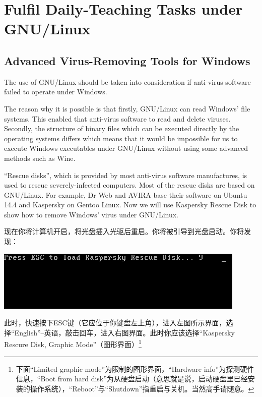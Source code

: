 \part{Fulfil Daily-Teaching Tasks under GNU/Linux}
\chapter{Advanced Virus-Removing Tools for Windows}
The use of GNU/Linux should be taken into consideration if anti-virus software failed to operate under Windows.\par
The reason why it is possible is that firstly, GNU/Linux can read Windows' file systems. This enabled that anti-virus software to read and delete viruses. Secondly, the structure of binary files which can be executed directly by the operating systems differs which means that it would be impossible for us to execute Windows executables under GNU/Linux without using some advanced methods such as Wine.\par
``Rescue disks'', which is provided by most anti-virus software manufactures, is used to rescue severely-infected computers. Most of the rescue disks are based on GNU/Linux. For example, Dr Web and AVIRA base their software on Ubuntu 14.4 and Kaspersky on Gentoo Linux. Now we will use Kaspersky Rescue Disk to show how to remove Windows' virus under GNU/Linux.\par
现在你将计算机开启，将光盘插入光驱后重启。你将被引导到光盘启动。你将发现：
\begin{center}
	\includegraphics[width=0.7\linewidth]{pic/krd1}
\end{center} \par
此时，快速按下ESC键（它应位于你键盘左上角），进入左图所示界面，选择“English”--英语，敲击回车，进入右图界面。此时你应该选择“Kaspersky Rescure Disk, Graphic Mode”（图形界面）\footnote{下面“Limited graphic mode”为限制的图形界面，“Hardware info”为探测硬件信息，“Boot from hard disk”为从硬盘启动（意思就是说，启动硬盘里已经安装的操作系统），“Reboot”与“Shutdown”指重启与关机。当然高手请随意。}
